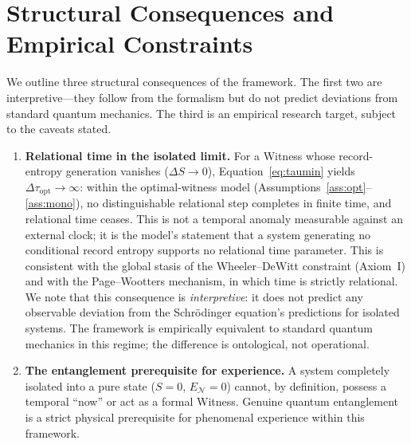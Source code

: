\documentclass[11pt, a4paper]{article}
\begin{document}
\section{Structural Consequences and Empirical Constraints}
\label{sec:empirical}

We outline three structural consequences of the framework. The first two are interpretive---they follow from the formalism but do not predict deviations from standard quantum mechanics. The third is an empirical research target, subject to the caveats stated.

\begin{enumerate}
    \item \textbf{Relational time in the isolated limit.} For a Witness whose record-entropy generation vanishes ($\Delta S \to 0$), Equation~\eqref{eq:taumin} yields $\Delta\tau_{\mathrm{opt}} \to \infty$: within the optimal-witness model (Assumptions~\ref{ass:opt}--\ref{ass:mono}), no distinguishable relational step completes in finite time, and relational time ceases. This is not a temporal anomaly measurable against an external clock; it is the model's statement that a system generating no conditional record entropy supports no relational time parameter. This is consistent with the global stasis of the Wheeler--DeWitt constraint (Axiom~I) and with the Page--Wootters mechanism, in which time is strictly relational. We note that this consequence is \emph{interpretive}: it does not predict any observable deviation from the Schr\"{o}dinger equation's predictions for isolated systems. The framework is empirically equivalent to standard quantum mechanics in this regime; the difference is ontological, not operational.

    \item \textbf{The entanglement prerequisite for experience.} A system completely isolated into a pure state ($S = 0$, $E_{\mathcal{N}} = 0$) cannot, by definition, possess a temporal ``now'' or act as a formal Witness. Genuine quantum entanglement is a strict physical prerequisite for phenomenal experience within this framework.


\end{enumerate}
\end{document}

